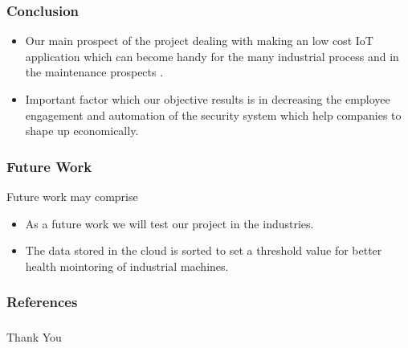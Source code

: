 \documentclass{beamer}
\begin{document}
\begin{frame}\frametitle{Conclusion}
\item 
\begin{itemize}
    
\end{itemize}
\begin{itemize}
\item Our main prospect of the project dealing with making an low cost IoT application which can become handy for the many industrial process and in the maintenance prospects .
\item 
Important factor which our objective results is in decreasing the employee engagement and automation of the security system which help companies to shape up economically.
\end{itemize}
\end{frame}
\begin{frame}\frametitle{Future Work}
Future work may comprise
\begin{itemize}
\item As a future work we will test our project in the industries.
\item The data stored in the cloud is sorted to set a threshold value for better health mointoring of industrial machines.
\end{itemize}
\end{frame}
\begin{frame}\frametitle{References}
\end{frame}

\begin{frame}\frametitle{}
\Huge
\begin{center}Thank You \end{center}
\end{frame}
\end{document}
